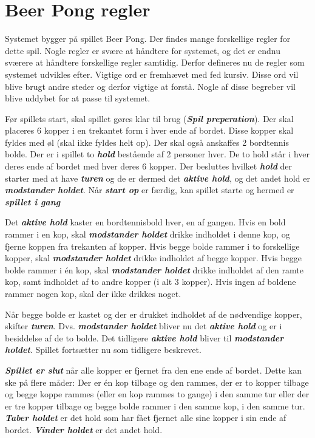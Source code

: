 \documentclass[Kravspecifikation/Kravspec_Main.tex]{subfiles}
\begin{document}
\section{Beer Pong regler} \label{sec:rules}
Systemet bygger på spillet Beer Pong. Der findes mange forskellige regler for dette spil. Nogle regler er svære at håndtere for systemet, og det er endnu sværere at håndtere forskellige regler samtidig. Derfor defineres nu de regler som systemet udvikles efter. Vigtige ord er fremhævet med fed kursiv. Disse ord vil blive brugt andre steder og derfor vigtige at forstå. Nogle af disse begreber vil blive uddybet for at passe til systemet.

Før spillets start, skal spillet gøres klar til brug (\textit{\textbf{Spil preperation}}). Der skal placeres 6 kopper i en trekantet form i hver ende af bordet. Disse kopper skal fyldes med øl (skal ikke fyldes helt op). Der skal også anskaffes 2 bordtennis bolde.  Der er i spillet to \textit{\textbf{hold}} bestående af 2 personer hver. De to hold står i hver deres ende af bordet med hver deres 6 kopper. Der besluttes hvilket \textit{\textbf{hold}} der starter med at have \textit{\textbf{turen}} og de er dermed  det \textit{\textbf{aktive hold}}, og det andet hold er \textit{\textbf{modstander holdet}}.  Når \textit{\textbf{start op}} er færdig, kan spillet starte og hermed er \textit{\textbf{spillet i gang}}

Det \textit{\textbf{aktive hold}} kaster en bordtennisbold hver, en af gangen. Hvis en bold rammer i en kop, skal \textit{\textbf{modstander holdet}} drikke indholdet i denne kop, og fjerne koppen fra trekanten af kopper. Hvis begge bolde rammer i to forskellige kopper, skal \textit{\textbf{modstander holdet}} drikke indholdet af begge kopper. Hvis begge bolde rammer i én kop, skal \textit{\textbf{modstander holdet}} drikke indholdet af den ramte kop, samt indholdet af to andre kopper (i alt 3 kopper). Hvis ingen af boldene rammer nogen kop, skal der ikke drikkes noget.

Når begge bolde er kastet og der er drukket indholdet af de nødvendige kopper, skifter \textit{\textbf{turen}}. Dvs. \textit{\textbf{modstander holdet}} bliver nu det \textit{\textbf{aktive hold}} og er i besiddelse af de to bolde. Det tidligere \textit{\textbf{aktive hold}} bliver til \textit{\textbf{modstander holdet}}. Spillet fortsætter nu som tidligere beskrevet.

\textit{\textbf{Spillet er slut}} når alle kopper er fjernet fra den ene ende af bordet. Dette kan ske på flere måder: Der er én kop tilbage og den rammes, der er to kopper tilbage og begge koppe rammes (eller en kop rammes to gange) i den samme tur eller der er tre kopper tilbage og begge bolde rammer i den samme kop, i den samme tur. \textit{\textbf{Taber holdet}} er det hold som har fået fjernet alle sine kopper i sin ende af bordet. \textit{\textbf{Vinder holdet}} er det andet hold. 
\end{document}
